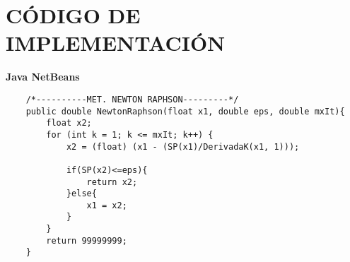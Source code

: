 \documentclass[a4paper, 12pt]{article}
\begin{document}
\section*{CÓDIGO DE IMPLEMENTACIÓN}
\textbf{Java NetBeans}
\begin{lstlisting}
	/*----------MET. NEWTON RAPHSON---------*/
    public double NewtonRaphson(float x1, double eps, double mxIt){
        float x2;
        for (int k = 1; k <= mxIt; k++) {
            x2 = (float) (x1 - (SP(x1)/DerivadaK(x1, 1)));
            
            if(SP(x2)<=eps){
                return x2;
            }else{
                x1 = x2;
            }
        }
        return 99999999;
    }
\end{lstlisting}



\end{document}
